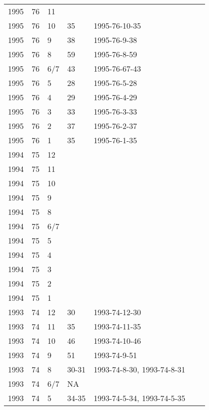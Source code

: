 \begin{longtable}{ |l|l|l|l|p{2.7cm}|l|p{2cm}| }
 1995 & 76 &    11 &         &                &  & \\
 1995 & 76 &    10 &    35   & 1995-76-10-35  &  & \\
 1995 & 76 &     9 &     38  &  1995-76-9-38  &  & \\
 1995 & 76 &     8 &     59  & 1995-76-8-59   &  & \\
 1995 & 76 &   6/7 &    43   & 1995-76-67-43  &  & \\
 1995 & 76 &     5 &    28   & 1995-76-5-28   &  & \\
 1995 & 76 &     4 &    29   & 1995-76-4-29   &  & \\
 1995 & 76 &     3 &    33   & 1995-76-3-33   &  & \\
 1995 & 76 &     2 &    37   & 1995-76-2-37   &  & \\
 1995 & 76 &     1 &   35    & 1995-76-1-35   &  & \\
 1994 & 75 &    12 &         &                &  & \\
 1994 & 75 &    11 &         &                &  & \\
 1994 & 75 &    10 &         &                &  & \\
 1994 & 75 &     9 &         &                &  & \\
 1994 & 75 &     8 &         &                &  & \\
 1994 & 75 &   6/7 &         &                &  & \\
 1994 & 75 &     5 &         &                &   & \\
 1994 & 75 &     4 &         &                &  & \\
 1994 & 75 &     3 &         &                &  & \\
 1994 & 75 &     2 &         &                &  & \\
 1994 & 75 &     1 &         &                &  & \\
 1993 & 74 &    12 &    30   &  1993-74-12-30 &  & \\
 1993 & 74 &    11 &     35  & 1993-74-11-35  &  & \\
 1993 & 74 &    10 &    46   & 1993-74-10-46  &  & \\
 1993 & 74 &     9 &   51    &  1993-74-9-51  &  & \\
 1993 & 74 &     8 & 30-31   & 1993-74-8-30, 1993-74-8-31&  & \\
 1993 & 74 &   6/7 &   NA    &                &  & \\
 1993 & 74 &     5 &  34-35  & 1993-74-5-34, 1993-74-5-35 &  & \\

\end{longtable}
